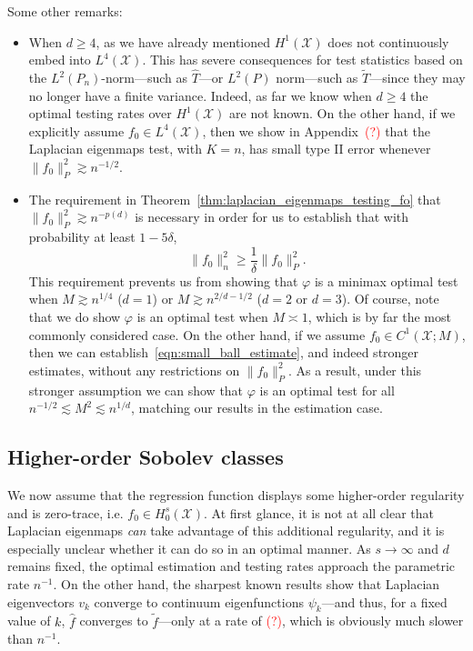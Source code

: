\documentclass{article}
\newcommand{\1}{\mathbf{1}}
\newcommand{\Leb}{L}
\newcommand{\mc}[1]{\mathcal{#1}}
\newcommand{\wt}[1]{\widetilde{#1}}
\newcommand{\wh}[1]{\widehat{#1}}
\theoremstyle{alden}
\theoremstyle{aldenthm}
\theoremstyle{definition}
\theoremstyle{remark}
\begin{document}
Some other remarks:
\begin{itemize}
	\item When $d \geq 4$, as we have already mentioned $H^1(\mc{X})$ does not continuously embed into $\Leb^4(\mc{X})$. This has severe consequences for test statistics based on the $L^2(P_n)$-norm---such as $\wh{T}$---or $L^2(P)$ norm---such as $\wt{T}$---since they may no longer have a finite variance. Indeed, as far we know when $d \geq 4$ the optimal testing rates over $H^1(\mc{X})$ are not known. On the other hand, if we explicitly assume $f_0 \in \Leb^4(\mc{X})$, then we show in Appendix~\textcolor{red}{(?)} that the Laplacian eigenmaps test, with $K = n$, has small type II error whenever $\|f_0\|_P^2 \gtrsim n^{-1/2}$. 
	\item The requirement in Theorem~\ref{thm:laplacian_eigenmaps_testing_fo} that $\|f_0\|_P^2 \gtrsim n^{-p(d)}$ is necessary in order for us to establish that with probability at least $1 - 5\delta$,
	\begin{equation}
	\label{eqn:small_ball_estimate}
	\|f_0\|_n^2 \geq \frac{1}{\delta}\|f_0\|_P^2.
	\end{equation}
	This requirement prevents us from showing that $\varphi$ is a minimax optimal test when $M \gtrsim n^{1/4}$ ($d = 1$) or $M \gtrsim n^{2/d - 1/2}$ ($d = 2$ or $d = 3$). Of course, note that we do show $\varphi$ is an optimal test when $M \asymp 1$, which is by far the most commonly considered case. On the other hand, if we assume $f_0 \in C^1(\mc{X};M)$, then we can establish~\eqref{eqn:small_ball_estimate}, and indeed stronger estimates, without any restrictions on $\|f_0\|_P^2$. As a result, under this stronger assumption we can show that $\varphi$ is an optimal test for all $n^{-1/2} \lesssim M^2 \lesssim n^{1/d}$, matching our results in the estimation case.
\end{itemize}

\subsection{Higher-order Sobolev classes}
\label{sec:higher_order_sobolev_classes}
We now assume that the regression function displays some higher-order regularity and is zero-trace, i.e. $f_0 \in H_0^s(\mc{X})$. At first glance, it is not at all clear that Laplacian eigenmaps \emph{can} take advantage of this additional regularity, and it is especially unclear whether it can do so in an optimal manner. As $s \to \infty$ and $d$ remains fixed, the optimal estimation and testing rates approach the parametric rate $n^{-1}$. On the other hand, the sharpest known results show that Laplacian eigenvectors $v_k$ converge to continuum eigenfunctions $\psi_k$---and thus, for a fixed value of $k$, $\wh{f}$ converges to $\wt{f}$---only at a rate of \textcolor{red}{(?)}, which is obviously much slower than $n^{-1}$. 
\end{document}
